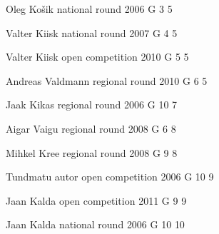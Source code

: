 \documentclass[11pt]{article}
\begin{document}
\ylDisplay{} %
{Oleg Košik} %
{national round} %
{2006} %
{G 3} %
{5} %
{

\ifEngStatement
\fi
}

\ylDisplay{} %
{Valter Kiisk} %
{national round} %
{2007} %
{G 4} %
{5} %
{

\ifEngStatement
\fi
}

\ylDisplay{} %
{Valter Kiisk} %
{open competition} %
{2010} %
{G 5} %
{5} %
{

\ifEngStatement
\fi
}

\ylDisplay{} %
{Andreas Valdmann} %
{regional round} %
{2010} %
{G 6} %
{5} %
{

\ifEngStatement
\fi
}

\ylDisplay{} %
{Jaak Kikas} %
{regional round} %
{2006} %
{G 10} %
{7} %
{

\ifEngStatement
\fi
}

\ylDisplay{} %
{Aigar Vaigu} %
{regional round} %
{2008} %
{G 6} %
{8} %
{

\ifEngStatement
\fi
}

\ylDisplay{} %
{Mihkel Kree} %
{regional round} %
{2008} %
{G 9} %
{8} %
{

\ifEngStatement
\fi
}

\ylDisplay{} %
{Tundmatu autor} %
{open competition} %
{2006} %
{G 10} %
{9} %
{

\ifEngStatement
\fi
}

\ylDisplay{} %
{Jaan Kalda} %
{open competition} %
{2011} %
{G 9} %
{9} %
{

\ifEngStatement
\fi
}

\ylDisplay{} %
{Jaan Kalda} %
{national round} %
{2006} %
{G 10} %
{10} %
{

\ifEngStatement
\fi
}
\newpage\subsection{\protect{}}
\end{document}
